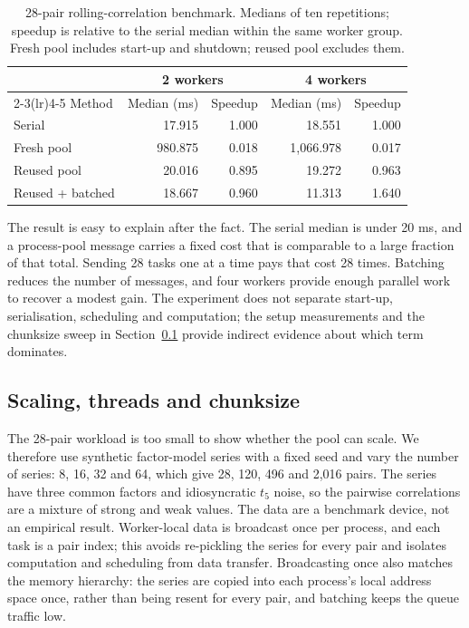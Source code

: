 \documentclass[journal]{IEEEtran}
\begin{document}
\begin{table}[t]
\caption{28-pair rolling-correlation benchmark. Medians of ten repetitions; speedup is relative to the serial median within the same worker group. Fresh pool includes start-up and shutdown; reused pool excludes them.}
\label{tab:parallel}
\centering
\small
\renewcommand{\arraystretch}{1.15}
\begin{tabular}{lrrrr}
\toprule
 & \multicolumn{2}{c}{2 workers} & \multicolumn{2}{c}{4 workers} \\
\cmidrule(lr){2-3}\cmidrule(lr){4-5}
Method & Median (ms) & Speedup & Median (ms) & Speedup \\
\midrule
Serial & 17.915 & 1.000 & 18.551 & 1.000 \\
Fresh pool & 980.875 & 0.018 & 1,066.978 & 0.017 \\
Reused pool & 20.016 & 0.895 & 19.272 & 0.963 \\
Reused + batched & 18.667 & 0.960 & 11.313 & 1.640 \\
\bottomrule
\end{tabular}
\end{table}

The result is easy to explain after the fact. The serial median is under 20 ms, and a process-pool message carries a fixed cost that is comparable to a large fraction of that total. Sending 28 tasks one at a time pays that cost 28 times. Batching reduces the number of messages, and four workers provide enough parallel work to recover a modest gain. The experiment does not separate start-up, serialisation, scheduling and computation; the setup measurements and the chunksize sweep in Section~\ref{sec:scaling} provide indirect evidence about which term dominates.

\subsection{Scaling, threads and chunksize}
\label{sec:scaling}
The 28-pair workload is too small to show whether the pool can scale. We therefore use synthetic factor-model series with a fixed seed and vary the number of series: 8, 16, 32 and 64, which give 28, 120, 496 and 2,016 pairs. The series have three common factors and idiosyncratic $t_5$ noise, so the pairwise correlations are a mixture of strong and weak values. The data are a benchmark device, not an empirical result. Worker-local data is broadcast once per process, and each task is a pair index; this avoids re-pickling the series for every pair and isolates computation and scheduling from data transfer. Broadcasting once also matches the memory hierarchy: the series are copied into each process's local address space once, rather than being resent for every pair, and batching keeps the queue traffic low.
\end{document}
